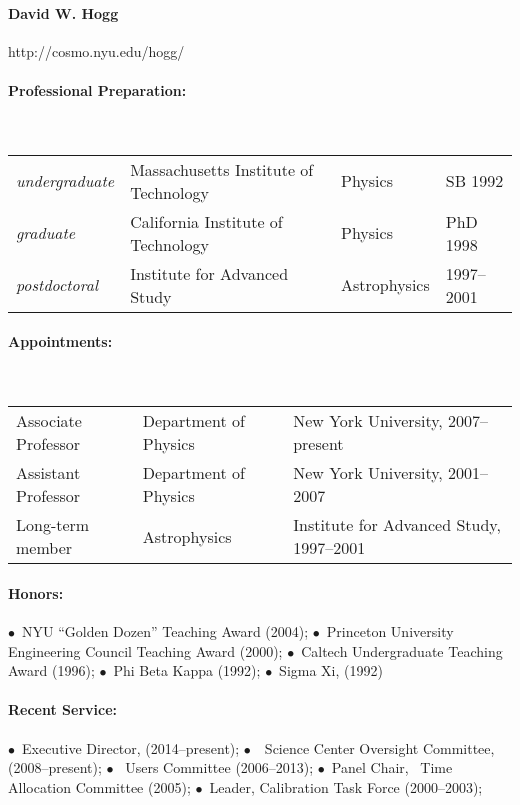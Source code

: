 \documentclass[letterpaper,12pt]{article}
\begin{document}
\paragraph{David W. Hogg} http://cosmo.nyu.edu/hogg/

\paragraph{Professional Preparation:}~\\[3pt]
\begin{tabular}{llll}
\textsl{undergraduate}
  & Massachusetts Institute of Technology & Physics & SB 1992\\
\textsl{graduate}
  & California Institute of Technology    & Physics & PhD 1998\\
\textsl{postdoctoral}
  & Institute for Advanced Study          & Astrophysics & 1997--2001
\end{tabular}
           
\paragraph{Appointments:}~\\[3pt]
\begin{tabular}{lll}
Associate Professor & Department of Physics & New York University, 2007--present\\
Assistant Professor & Department of Physics & New York University, 2001--2007\\
Long-term member & Astrophysics & Institute for Advanced Study, 1997--2001 \\
\end{tabular}

\paragraph{Honors:}
$\bullet$~NYU ``Golden Dozen'' Teaching Award (2004);
$\bullet$~Princeton University Engineering Council Teaching Award (2000);
$\bullet$~Caltech Undergraduate Teaching Award (1996);
$\bullet$~Phi Beta Kappa (1992);
$\bullet$~Sigma Xi, (1992)

\paragraph{Recent Service:}
$\bullet$~Executive Director,  (2014--present);
$\bullet$~\Spitzer\ Science Center Oversight Committee, (2008--present); 
$\bullet$~ Users Committee (2006--2013);
$\bullet$~Panel Chair, \Spitzer\ Time Allocation Committee (2005);
$\bullet$~Leader,  Calibration Task Force (2000--2003);
\end{document}
